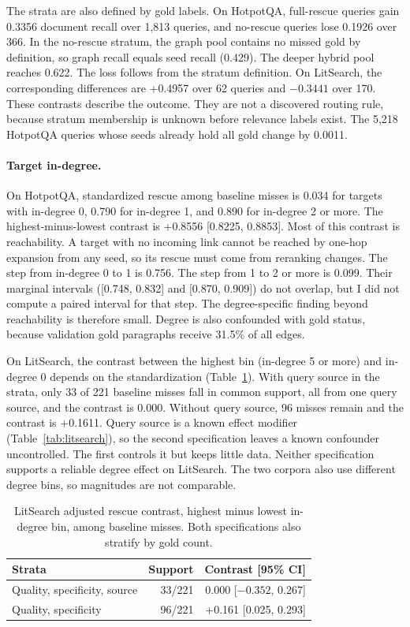\documentclass[10pt,twocolumn]{article}
\begin{document}
The strata are also defined by gold labels. On HotpotQA, full-rescue queries
gain 0.3356 document recall over 1,813 queries, and no-rescue queries lose
0.1926 over 366. In the no-rescue stratum, the graph pool contains no missed
gold by definition, so graph recall equals seed recall (0.429). The deeper
hybrid pool reaches 0.622. The loss follows from the stratum definition. On
LitSearch, the corresponding differences are +0.4957 over 62 queries and
$-0.3441$ over 170. These contrasts describe the outcome. They are not a
discovered routing rule, because stratum membership is unknown before
relevance labels exist. The 5,218 HotpotQA queries whose seeds already hold all
gold change by 0.0011.

\paragraph{Target in-degree.}
On HotpotQA, standardized rescue among baseline misses is 0.034 for targets
with in-degree 0, 0.790 for in-degree 1, and 0.890 for in-degree 2 or more.
The highest-minus-lowest contrast is +0.8556 [0.8225, 0.8853]. Most of this
contrast is reachability. A target with no incoming link cannot be reached by
one-hop expansion from any seed, so its rescue must come from reranking
changes. The step from in-degree 0 to 1 is 0.756. The step from 1 to 2 or more
is 0.099. Their marginal intervals ([0.748, 0.832] and [0.870, 0.909]) do not
overlap, but I did not compute a paired interval for that step. The
degree-specific finding beyond reachability is therefore small. Degree is also
confounded with gold status, because validation gold paragraphs receive
31.5\% of all edges.

On LitSearch, the contrast between the highest bin (in-degree 5 or more) and
in-degree 0 depends on the standardization (Table~\ref{tab:litdegree}). With
query source in the strata, only 33 of 221 baseline misses fall in common
support, all from one query source, and the contrast is 0.000. Without query
source, 96 misses remain and the contrast is +0.1611. Query source is a known
effect modifier (Table~\ref{tab:litsearch}), so the second specification
leaves a known confounder uncontrolled. The first controls it but keeps little
data. Neither specification supports a reliable degree effect on LitSearch.
The two corpora also use different degree bins, so magnitudes are not
comparable.

\begin{table}[t]
  \centering
  \caption{LitSearch adjusted rescue contrast, highest minus lowest in-degree
  bin, among baseline misses. Both specifications also stratify by gold count.}
  \label{tab:litdegree}
  \small
  \setlength{\tabcolsep}{3pt}
  \begin{tabular}{lrr}
    \toprule
    Strata & Support & Contrast [95\% CI] \\
    \midrule
    Quality, specificity, source & 33/221 & 0.000 [$-0.352$, 0.267] \\
    Quality, specificity & 96/221 & +0.161 [0.025, 0.293] \\
    \bottomrule
  \end{tabular}
\end{table}
\end{document}
